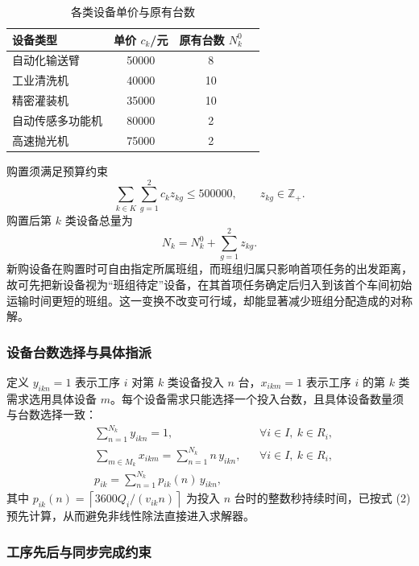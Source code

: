 \documentclass[12pt,a4paper]{article}
\begin{document}
\begin{table}[H]
\centering
\caption{各类设备单价与原有台数}
\small
\label{tab:p4price}
\begin{tabular}{lccc}
\toprule
设备类型 & 单价 $c_k$/元 & 原有台数 $N_k^0$ \\
\midrule
自动化输送臂 & 50000 & 8 \\
工业清洗机 & 40000 & 10 \\
精密灌装机 & 35000 & 10 \\
自动传感多功能机 & 80000 & 2 \\
高速抛光机 & 75000 & 2 \\
\bottomrule
\end{tabular}
\end{table}

购置须满足预算约束
\begin{equation}
\sum_{k\in K}\sum_{g=1}^{2} c_k z_{kg}\le 500000,\qquad z_{kg}\in\mathbb{Z}_+ .
\label{eq:p4budget}
\end{equation}
购置后第 $k$ 类设备总量为
\begin{equation}
N_k=N_k^0+\sum_{g=1}^{2} z_{kg} .
\end{equation}
新购设备在购置时可自由指定所属班组，而班组归属只影响首项任务的出发距离，故可先把新设备视为“班组待定”设备，在其首项任务确定后归入到该首个车间初始运输时间更短的班组。这一变换不改变可行域，却能显著减少班组分配造成的对称解。

\subsubsection{设备台数选择与具体指派}

定义 $y_{ikn}=1$ 表示工序 $i$ 对第 $k$ 类设备投入 $n$ 台，$x_{ikm}=1$ 表示工序 $i$ 的第 $k$ 类需求选用具体设备 $m$。每个设备需求只能选择一个投入台数，且具体设备数量须与台数选择一致：
\begin{align}
&\sum_{n=1}^{N_k} y_{ikn}=1, && \forall i\in I,\ k\in R_i,\\
&\sum_{m\in M_k} x_{ikm}=\sum_{n=1}^{N_k} n\,y_{ikn}, && \forall i\in I,\ k\in R_i,\\
&p_{ik}=\sum_{n=1}^{N_k} p_{ik}(n)\,y_{ikn},
\end{align}
其中 $p_{ik}(n)=\left\lceil 3600 Q_i/(v_{ik}n)\right\rceil$ 为投入 $n$ 台时的整数秒持续时间，已按式 (2) 预先计算，从而避免非线性除法直接进入求解器。

\subsubsection{工序先后与同步完成约束}
\end{document}

